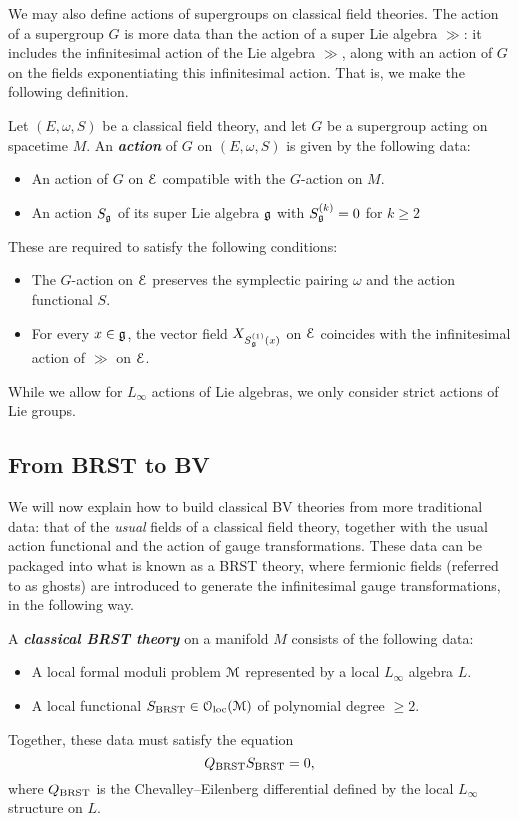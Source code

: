 \documentclass[10pt, oneside]{article}
\newcommand{\defterm}[1]{\textbf{\emph{#1}}}
\begin{document}
We may also define actions of supergroups on classical field theories.  The action of a supergroup $G$ is more data than the action of a super Lie algebra $\gg$: it includes the infinitesimal action of the Lie algebra $\gg$, along with an action of $G$ on the fields exponentiating this infinitesimal action.  That is, we make the following definition.

\begin{definition}
\label{group_action_def}
Let $(E, \omega, S)$ be a classical field theory, and let $G$ be a supergroup acting on spacetime $M$. An \defterm{action} of $G$ on $(E, \omega, S)$ is given by the following data:
\begin{itemize}
\item An action of $G$ on $\mathcal E$ compatible with the $G$-action on $M$.

\item An action $S_\mathfrak g$ of its super Lie algebra $\mathfrak g$ with $S^{(k)}_\mathfrak g = 0$ for $k\geq 2$ 
\end{itemize}
These are required to satisfy the following conditions:
\begin{itemize}
\item The $G$-action on $\mathcal E$ preserves the symplectic pairing $\omega$ and the action functional $S$.

\item For every $x\in\mathfrak g$, the vector field $X_{{S^{(1)}_\mathfrak g}(x)}$ on $\mathcal E$ coincides with the infinitesimal action of $\gg$ on $\mathcal E$.
\end{itemize}
\end{definition}

\begin{remark}
While we allow for $L_\infty$ actions of Lie algebras, we only consider strict actions of Lie groups.
\end{remark}

\subsection{From BRST to BV}
We will now explain how to build classical BV theories from more traditional data: that of the \emph{usual} fields of a classical field theory, together with the usual action functional and the action of gauge transformations.  These data can be packaged into what is known as a BRST theory, where fermionic fields (referred to as ghosts) are introduced to generate the infinitesimal gauge transformations, in the following way.

\begin{definition}
A \defterm{classical BRST theory} on a manifold $M$ consists of the following data:
\begin{itemize}
\item A local formal moduli problem $\mathcal M$ represented by a local $L_\infty$ algebra $L$.
\item A local functional $S_{\mathrm{BRST}} \in \mathcal{O}_{\rm loc}(\mathcal M)$ of polynomial degree $\geq 2$.
\end{itemize}
Together, these data must satisfy the equation
\[Q_{\mathrm{BRST}} S_{\mathrm{BRST}} = 0,\]
where $Q_{\mathrm{BRST}}$ is the Chevalley--Eilenberg differential defined by the local $L_\infty$ structure on $L$.
\end{definition}
\end{document}
